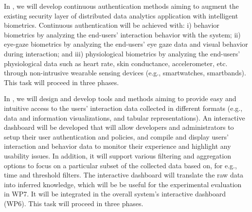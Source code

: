 \begin{Workpackage}{\thewpno}
\begin{Task}

\TaskResults{%
}
\TaskHeader{}

In \theTask, we will develop continuous authentication methods aiming to augment the existing security layer of distributed data analytics application with intelligent biometrics. Continuous authentication will be achieved with: i) behavior biometrics by analyzing the end-users' interaction behavior with the system; ii) eye-gaze biometrics by analyzing the end-users' eye gaze data and visual behavior during interaction; and iii) physiological biometrics by analyzing the end-users' physiological data such as heart rate, skin conductance, accelerometer, etc. through non-intrusive wearable sensing devices (e.g., smartwatches, smartbands).
This task will proceed in three phases. 
\end{Task}


\begin{Task}
\TaskResults{%
}
\TaskHeader{}

In \theTask, we will design and develop tools and methods aiming to provide easy and intuitive access to the users’ interaction data collected in different formats (e.g., data and information visualizations, and tabular representations). An interactive dashboard will be developed that will allow developers and administrators to setup their user authentication and policies, and compile and display users’ interaction and behavior data to monitor their experience and highlight any usability issues. In addition, it will support various filtering and aggregation options to focus on a particular subset of the collected data based on, for e.g., time and threshold filters. The interactive dashboard will translate the raw data into inferred knowledge, which will be be useful for the experimental evaluation in WP7. It will be integrated in the overall system's interactive dashboard (WP6). This task will proceed in three phases. 
\end{Task}


\end{Workpackage}
